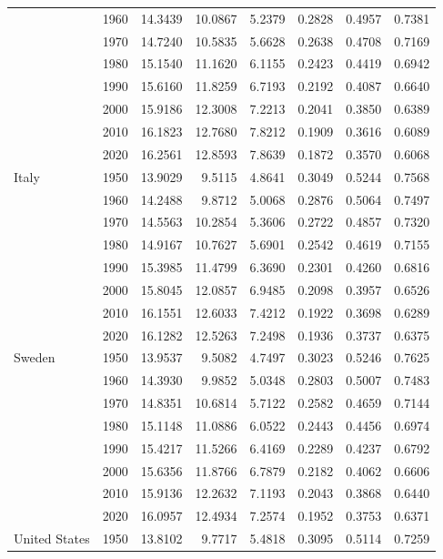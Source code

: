 \documentclass[12pt]{article}
\begin{document}
\begin{table}[htb!]
\begin{tabular*}{\textwidth}{@{\extracolsep{\fill}}llrrrrrr}
 & 1960 & 14.3439 & 10.0867 & 5.2379 & 0.2828 & 0.4957 & 0.7381\\
 & 1970 & 14.7240 & 10.5835 & 5.6628 & 0.2638 & 0.4708 & 0.7169\\
 & 1980 & 15.1540 & 11.1620 & 6.1155 & 0.2423 & 0.4419 & 0.6942\\
 & 1990 & 15.6160 & 11.8259 & 6.7193 & 0.2192 & 0.4087 & 0.6640\\
 & 2000 & 15.9186 & 12.3008 & 7.2213 & 0.2041 & 0.3850 & 0.6389\\
 & 2010 & 16.1823 & 12.7680 & 7.8212 & 0.1909 & 0.3616 & 0.6089\\
 & 2020 & 16.2561 & 12.8593 & 7.8639 & 0.1872 & 0.3570 & 0.6068\\
\addlinespace[3pt]
Italy & 1950 & 13.9029 & 9.5115 & 4.8641 & 0.3049 & 0.5244 & 0.7568\\
 & 1960 & 14.2488 & 9.8712 & 5.0068 & 0.2876 & 0.5064 & 0.7497\\
 & 1970 & 14.5563 & 10.2854 & 5.3606 & 0.2722 & 0.4857 & 0.7320\\
 & 1980 & 14.9167 & 10.7627 & 5.6901 & 0.2542 & 0.4619 & 0.7155\\
 & 1990 & 15.3985 & 11.4799 & 6.3690 & 0.2301 & 0.4260 & 0.6816\\
 & 2000 & 15.8045 & 12.0857 & 6.9485 & 0.2098 & 0.3957 & 0.6526\\
 & 2010 & 16.1551 & 12.6033 & 7.4212 & 0.1922 & 0.3698 & 0.6289\\
 & 2020 & 16.1282 & 12.5263 & 7.2498 & 0.1936 & 0.3737 & 0.6375\\
\addlinespace[3pt]
Sweden & 1950 & 13.9537 & 9.5082 & 4.7497 & 0.3023 & 0.5246 & 0.7625\\
 & 1960 & 14.3930 & 9.9852 & 5.0348 & 0.2803 & 0.5007 & 0.7483\\
 & 1970 & 14.8351 & 10.6814 & 5.7122 & 0.2582 & 0.4659 & 0.7144\\
 & 1980 & 15.1148 & 11.0886 & 6.0522 & 0.2443 & 0.4456 & 0.6974\\
 & 1990 & 15.4217 & 11.5266 & 6.4169 & 0.2289 & 0.4237 & 0.6792\\
 & 2000 & 15.6356 & 11.8766 & 6.7879 & 0.2182 & 0.4062 & 0.6606\\
 & 2010 & 15.9136 & 12.2632 & 7.1193 & 0.2043 & 0.3868 & 0.6440\\
 & 2020 & 16.0957 & 12.4934 & 7.2574 & 0.1952 & 0.3753 & 0.6371\\
\addlinespace[3pt]
United States & 1950 & 13.8102 & 9.7717 & 5.4818 & 0.3095 & 0.5114 & 0.7259\\

\end{tabular*}
\end{table}
\end{document}
